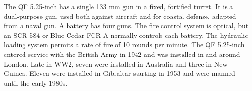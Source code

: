\begin{withcounters}

    The QF 5.25-inch has a single 133 mm gun in a fixed, fortified turret.
    It is a dual-purpose gun, used both against aircraft and for coastal defense, adapted from a naval gun.
    A battery has four guns.
    The fire control system is optical, but an SCR-584 or Blue Cedar FCR-A normally controls each battery.
    The hydraulic loading system permits a rate of fire of 10 rounds per minute.
    The QF 5.25-inch entered service with the British Army in 1942 and was installed in and around London. Late in WW2, seven were installed in Australia and three in New Guinea. Eleven were installed in Gibraltar starting in 1953 and were manned until the early 1980s.%

\end{withcounters}

